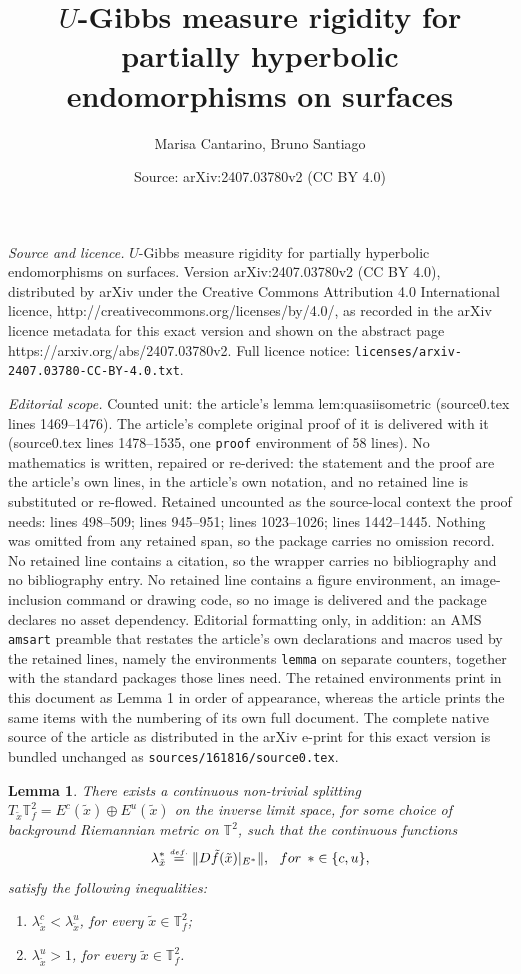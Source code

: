 \documentclass[10pt,a4paper]{amsart}
\title{$\mathbf{\textit{U}}$-Gibbs measure rigidity for partially hyperbolic endomorphisms on surfaces}
\author{Marisa Cantarino, Bruno Santiago}
\date{Source: arXiv:2407.03780v2 (CC BY 4.0)}
\newtheorem{lemma}{Lemma}
\newcommand{\TT}{{\mathbb{T}^2}}
\newcommand{\TTf}{{\mathbb{T}_f^2}}
\newcommand{\eqdef}{\stackrel{\scriptscriptstyle\textrm def.}{=}}
\newcommand{\tix}{\tilde{x}}
\begin{document}
\maketitle

\noindent\emph{Source and licence.} $\mathbf{\textit{U}}$-Gibbs measure rigidity for partially hyperbolic endomorphisms on surfaces. Version arXiv:2407.03780v2 (CC BY 4.0), distributed by arXiv under the Creative Commons Attribution 4.0 International licence, http://creativecommons.org/licenses/by/4.0/, as recorded in the arXiv licence metadata for this exact version and shown on the abstract page https://arxiv.org/abs/2407.03780v2. Full licence notice: \texttt{licenses/arxiv-2407.03780-CC-BY-4.0.txt}.\par\smallskip

\noindent\textit{Editorial scope.} Counted unit: the article's lemma lem:quasiisometric (source0.tex lines 1469--1476). The article's complete original proof of it is delivered with it (source0.tex lines 1478--1535, one \texttt{proof} environment of 58 lines). No mathematics is written, repaired or re-derived: the statement and the proof are the article's own lines, in the article's own notation, and no retained line is substituted or re-flowed.  Retained uncounted as the source-local context the proof needs: lines 498--509; lines 945--951; lines 1023--1026; lines 1442--1445.  Nothing was omitted from any retained span, so the package carries no omission record.  No retained line contains a citation, so the wrapper carries no bibliography and no bibliography entry.  No retained line contains a figure environment, an image-inclusion command or drawing code, so no image is delivered and the package declares no asset dependency.  Editorial formatting only, in addition: an AMS \texttt{amsart} preamble that restates the article's own declarations and macros used by the retained lines, namely the environments \texttt{lemma} on separate counters, together with the standard packages those lines need.  The retained environments print in this document as Lemma 1 in order of appearance, whereas the article prints the same items with the numbering of its own full document.  The complete native source of the article as distributed in the arXiv e-print for this exact version is bundled unchanged as \texttt{sources/161816/source0.tex}.
\begin{lemma}
    \label{lem:defideph}
There exists a continuous non-trivial splitting  $T_{\tix}\TTf=E^c(\tix)\oplus E^u(\tix)$ on the inverse limit space, for some choice of background Riemannian metric on $\TT$, such that the continuous functions
\[
\lambda^{*}_{\tix}\eqdef\|D\tilde{f}(\tix)|_{E^{*}}\|,\:\:\:\textrm{for}\:\: * \in \{c,u\},
\]
satisfy the following inequalities:
\begin{enumerate}
\item$\lambda^c_{\tix}<\lambda^u_{\tix}$, for every $\tix\in\TTf$;
\item  $\lambda^u_{\tix}>1$, for  every $\tix\in\TTf$.
\end{enumerate}
\end{lemma}
\end{document}

